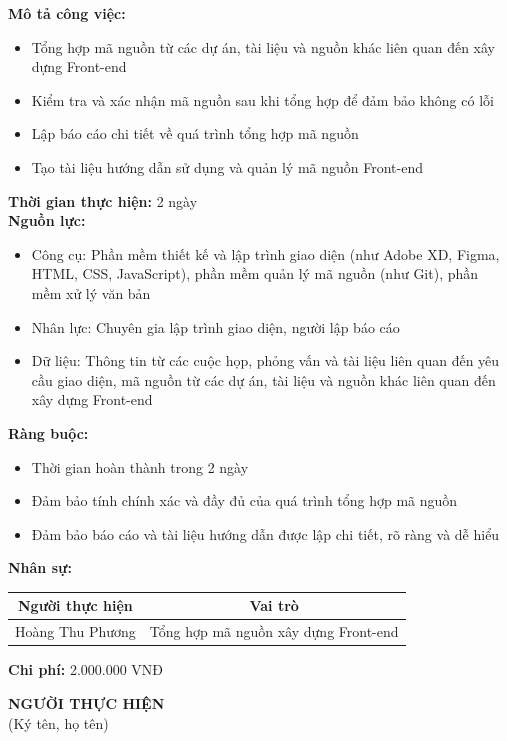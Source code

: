{\begin{minipage}{\textwidth}
    \vspace{0.5cm}
    \noindent \textbf{Mô tả công việc:}
    \begin{itemize}
        \item Tổng hợp mã nguồn từ các dự án, tài liệu và nguồn khác liên quan đến xây dựng Front-end
        \item Kiểm tra và xác nhận mã nguồn sau khi tổng hợp để đảm bảo không có lỗi
        \item Lập báo cáo chi tiết về quá trình tổng hợp mã nguồn
        \item Tạo tài liệu hướng dẫn sử dụng và quản lý mã nguồn Front-end
    \end{itemize}
    \vspace{0.5cm}
    \noindent \textbf{Thời gian thực hiện:} 2 ngày \\
    \noindent \textbf{Nguồn lực:}
    \begin{itemize}
        \item Công cụ: Phần mềm thiết kế và lập trình giao diện (như Adobe XD, Figma, HTML, CSS, JavaScript), phần mềm quản lý mã nguồn (như Git), phần mềm xử lý văn bản
        \item Nhân lực: Chuyên gia lập trình giao diện, người lập báo cáo
        \item Dữ liệu: Thông tin từ các cuộc họp, phỏng vấn và tài liệu liên quan đến yêu cầu giao diện, mã nguồn từ các dự án, tài liệu và nguồn khác liên quan đến xây dựng Front-end
    \end{itemize}
    \vspace{0.5cm}
    \noindent \textbf{Ràng buộc:}
    \begin{itemize}
        \item Thời gian hoàn thành trong 2 ngày
        \item Đảm bảo tính chính xác và đầy đủ của quá trình tổng hợp mã nguồn
        \item Đảm bảo báo cáo và tài liệu hướng dẫn được lập chi tiết, rõ ràng và dễ hiểu
    \end{itemize}
    \vspace{0.5cm}
    \noindent \textbf{Nhân sự:}
    \begin{longtable}{|c|c|}
    \hline
    \textbf{Người thực hiện} & \textbf{Vai trò} \\
    \hline
    Hoàng Thu Phương & Tổng hợp mã nguồn xây dựng Front-end \\
    \hline
    \end{longtable}
    \vspace{0.5cm}
    \noindent \textbf{Chi phí:} 2.000.000 VNĐ \\
    \vspace{1cm}
    \begin{flushleft}
        \hspace{8cm} \textbf{NGƯỜI THỰC HIỆN} \\
        \hspace{8.8cm} (Ký tên, họ tên) \\
        \vspace{1cm}
    \end{flushleft}
    \end{minipage}
}
% 
